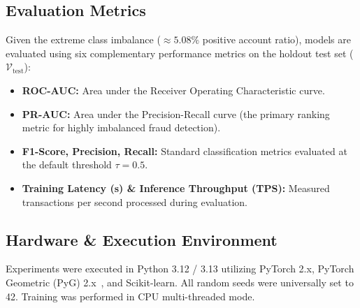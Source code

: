 \subsection{Evaluation Metrics}
Given the extreme class imbalance ($\approx 5.08\%$ positive account ratio), models are evaluated using six complementary performance metrics on the holdout test set ($\mathcal{V}_{\text{test}}$):
\begin{itemize}
    \item \textbf{ROC-AUC:} Area under the Receiver Operating Characteristic curve.
    \item \textbf{PR-AUC:} Area under the Precision-Recall curve (the primary ranking metric for highly imbalanced fraud detection).
    \item \textbf{F1-Score, Precision, Recall:} Standard classification metrics evaluated at the default threshold $\tau = 0.5$.
    \item \textbf{Training Latency (s) & Inference Throughput (TPS):} Measured transactions per second processed during evaluation.
\end{itemize}

\subsection{Hardware \&  Execution Environment}
Experiments were executed in Python 3.12 / 3.13 utilizing PyTorch 2.x, PyTorch Geometric (PyG) 2.x~\cite{fey2019fast}, and Scikit-learn. All random seeds were universally set to 42. Training was performed in CPU multi-threaded mode.
